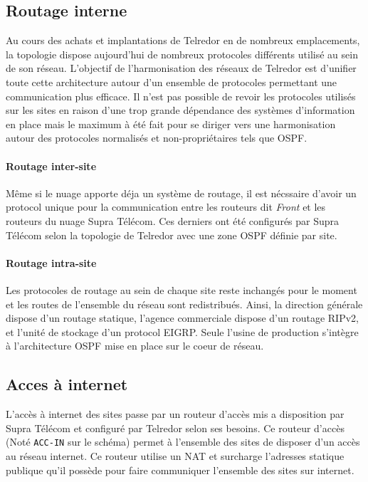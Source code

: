 \documentclass{article}
\newcommand{\tlr}{Telredor\xspace}
\newcommand{\spr}{Supra Télécom\xspace}
\begin{document}
\subsection{Routage interne}

Au cours des achats et implantations de \tlr en de nombreux emplacements, la topologie dispose aujourd'hui de nombreux protocoles différents utilisé au sein de son réseau.
L'objectif de l'harmonisation des réseaux de \tlr est d'unifier toute cette architecture autour d'un ensemble de protocoles permettant une communication plus efficace.
Il n'est pas possible de revoir les protocoles utilisés sur les sites en raison d'une trop grande dépendance des systèmes d'information en place mais le maximum à été fait pour se diriger vers une harmonisation autour des protocoles normalisés et non-propriétaires tels que OSPF.

\paragraph{Routage inter-site} Même si le nuage apporte déja un système de routage, il est nécssaire d'avoir un protocol unique pour la communication entre les routeurs dit \emph{Front} et les routeurs du nuage \spr.
Ces derniers ont été configurés par \spr selon la topologie de \tlr avec une zone OSPF définie par site.

\paragraph{Routage intra-site} Les protocoles de routage au sein de chaque site reste inchangés pour le moment et les routes de l'ensemble du réseau sont redistribués.
Ainsi, la direction générale dispose d'un routage statique, l'agence commerciale dispose d'un routage RIPv2, et l'unité de stockage d'un protocol EIGRP.
Seule l'usine de production s'intègre à l'architecture OSPF mise en place sur le coeur de réseau.

\subsection{Acces à internet}

L'accès à internet des sites passe par un routeur d'accès mis a disposition par \spr et configuré par \tlr selon ses besoins.
Ce routeur d'accès (Noté \texttt{ACC-IN} sur le schéma) permet à l'ensemble des sites de disposer d'un accès au réseau internet.
Ce routeur utilise un NAT et surcharge l'adresses statique publique qu'il possède pour faire communiquer l'ensemble des sites sur internet.
\end{document}
